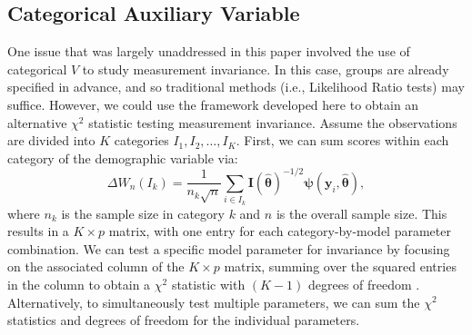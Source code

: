 \documentclass[man]{apa}
\begin{document}
\subsection{Categorical Auxiliary Variable}

One issue that was largely unaddressed in this paper involved the use
of categorical $V$ to study measurement invariance.  In this case,
groups are 
already specified in advance, and so traditional methods (i.e.,
Likelihood Ratio tests) may suffice.
However, we could use the framework developed here to obtain an
alternative $\chi^2$ statistic testing measurement invariance.
Assume the observations are divided into $K$ categories $I_1, I_2,
\ldots, I_K$.
First, we can sum scores within each category of the
demographic variable via:
\begin{equation}
    \label{eq:catsum}
    \Delta W_n(I_k) = \frac{1}{n_k\sqrt{n}} \sum_{i \in I_k}
    {\bm{I}}(\widehat{\bm{\theta}})^{-1/2} {\bm{\psi}}({\bm{y}}_i, \widehat{{\bm
      \theta}}),
\end{equation}
where $n_k$ is the sample size in category $k$ and $n$ is the overall
sample size.  This results in a $K \times p$ matrix, with one entry for
each category-by-model parameter combination.  We can test
a specific model parameter for invariance by focusing on the associated
column of the $K \times p$ matrix, summing over the squared entries in
the column to obtain a $\chi^2$ statistic with
$(K-1)$ degrees of freedom \cite{HjoKon02}.
Alternatively, to simultaneously test multiple parameters, we can sum
the $\chi^2$ statistics and degrees of freedom for the individual
parameters.
\end{document}

